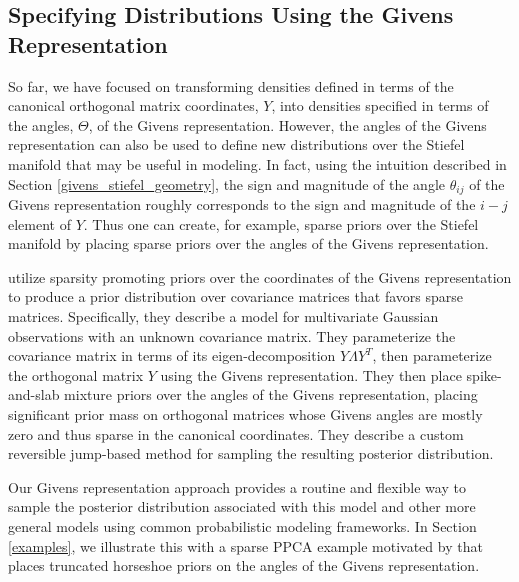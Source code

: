 \documentclass[ba]{imsart}
\numberwithin{equation}{section}
\theoremstyle{plain}
\begin{document}
\subsection{Specifying Distributions Using the Givens Representation}
So far, we have focused on transforming densities defined in terms of the canonical orthogonal matrix coordinates, $Y$, into densities specified in terms of the angles, $\Theta$, of the Givens representation. However, the angles of the Givens representation can also be used to define new distributions over the Stiefel manifold that may be useful in modeling. In fact, using the intuition described in Section \ref{givens_stiefel_geometry}, the sign and magnitude of the angle $\theta_{ij}$ of the Givens representation roughly corresponds to the sign and magnitude of the $i-j$ element of $Y$. Thus one can create, for example, sparse priors over the Stiefel manifold by placing sparse priors over the angles of the Givens representation.

\noindent \cite{cron2016models} utilize sparsity promoting priors over the coordinates of the Givens representation to produce a prior distribution over covariance matrices that favors sparse matrices. Specifically, they describe a model for multivariate Gaussian observations with an unknown covariance matrix. They parameterize the covariance matrix in terms of its eigen-decomposition $Y \Lambda Y^T$, then parameterize the orthogonal matrix $Y$ using the Givens representation. They then place spike-and-slab mixture priors over the angles of the Givens representation, placing significant prior mass on orthogonal matrices whose Givens angles are mostly zero and thus sparse in the canonical coordinates. They describe a custom reversible jump-based method for sampling the resulting posterior distribution.

\noindent Our Givens representation approach provides a routine and flexible way to sample the posterior distribution associated with this model and other more general models using common probabilistic modeling frameworks. In Section \ref{examples}, we illustrate this with a sparse PPCA example motivated by \cite{cron2016models} that places truncated horseshoe priors on the angles of the Givens representation.


\end{document}
